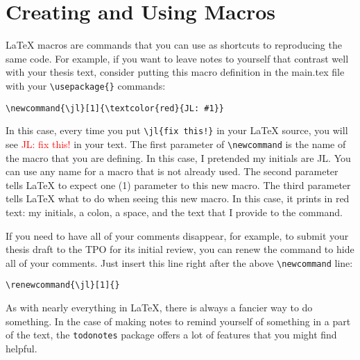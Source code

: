 
\section{Creating and Using Macros}
\LaTeX{} macros are commands that you can use as shortcuts to reproducing the same code.
For example, if you want to leave notes to yourself that contrast well with your thesis text, consider putting this macro definition in the main.tex file with your \verb|\usepackage{}| commands:

\verb|\newcommand{\jl}[1]{\textcolor{red}{JL: #1}}|

In this case, every time you put \verb|\jl{fix this!}| in your \LaTeX{} source, you will see \textcolor{red}{JL: fix this!} in your text.
The first parameter of \verb|\newcommand| is the name of the macro that you are defining.  In this case, I pretended my initials are JL.  You can use any name for a macro that is not already used.
The second parameter tells \LaTeX{} to expect one (1) parameter to this new macro.
The third parameter tells \LaTeX{} what to do when seeing this new macro.  In this case, it prints in red text: my initials, a colon, a space, and the text that I provide to the command.

If you need to have all of your comments disappear, for example, to submit your thesis draft to the TPO for its initial review, you can renew the command to hide all of your comments.  Just insert this line right after the above \verb|\newcommand| line:

\verb|\renewcommand{\jl}[1]{}|

As with nearly everything in \LaTeX{}, there is always a fancier way to do something.
In the case of making notes to remind yourself of something in a part of the text, the \texttt{todonotes} package offers a lot of features that you might find helpful.

